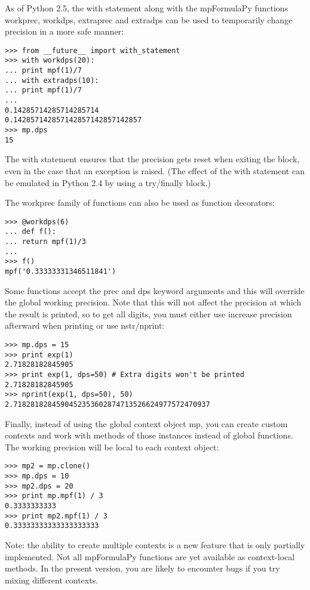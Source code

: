 As of Python 2.5, the with statement along with the mpFormulaPy functions workprec, workdps, extraprec and extradps can be used to temporarily change precision in a more safe manner:

\begin{lstlisting}
>>> from __future__ import with_statement
>>> with workdps(20):
... print mpf(1)/7
... with extradps(10):
... print mpf(1)/7
...
0.14285714285714285714
0.142857142857142857142857142857
>>> mp.dps
15
\end{lstlisting}


The with statement ensures that the precision gets reset when exiting the block, even in the case that an exception is raised. (The effect of the with statement can be emulated in Python 2.4 by using a try/finally block.)

The workprec family of functions can also be used as function decorators:

\begin{lstlisting}
>>> @workdps(6)
... def f():
... return mpf(1)/3
...
>>> f()
mpf('0.33333331346511841')
\end{lstlisting}


Some functions accept the prec and dps keyword arguments and this will override the global working precision. Note that this will not affect the precision at which the result is printed, so to get all digits, you must either use increase precision afterward when printing or use nstr/nprint:

\begin{lstlisting}
>>> mp.dps = 15
>>> print exp(1)
2.71828182845905
>>> print exp(1, dps=50) # Extra digits won't be printed
2.71828182845905
>>> nprint(exp(1, dps=50), 50)
2.7182818284590452353602874713526624977572470937
\end{lstlisting}


Finally, instead of using the global context object mp, you can create custom contexts and work with methods of those instances instead of global functions. The working precision will be local to each context object:

\begin{lstlisting}
>>> mp2 = mp.clone()
>>> mp.dps = 10
>>> mp2.dps = 20
>>> print mp.mpf(1) / 3
0.3333333333
>>> print mp2.mpf(1) / 3
0.33333333333333333333
\end{lstlisting}


Note: the ability to create multiple contexts is a new feature that is only partially implemented. Not all mpFormulaPy functions are yet available as context-local methods. In the present version, you are likely to encounter bugs if you try mixing different contexts.


